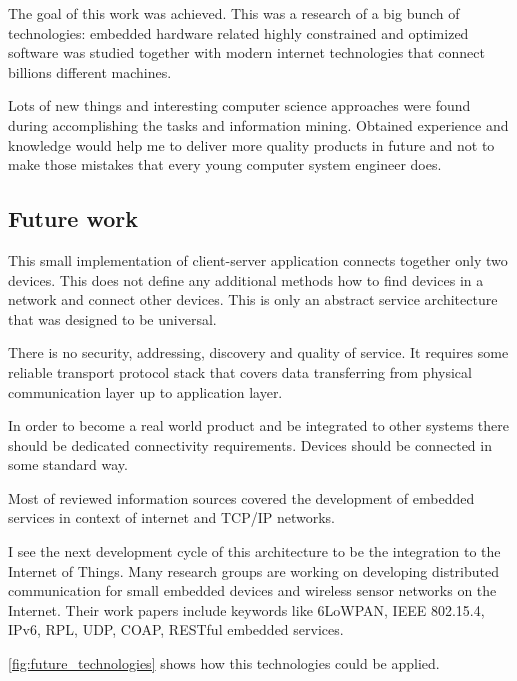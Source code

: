 The goal of this work was achieved.
This was a research of a big bunch of technologies: embedded hardware related
highly constrained and optimized software was studied together with  modern
internet technologies that connect billions different machines.

Lots of new things and interesting computer science approaches were found during 
accomplishing the tasks and information mining.
Obtained experience and knowledge would help me to
deliver more quality products in future and not to make those mistakes that
every young computer system engineer does.

\subsection{Future work}
This small implementation of client-server application connects together only
two devices. 
This does not define any additional methods how to find
devices in a network and connect other devices.
This is only an abstract service architecture that was designed to be universal.

There is no security, addressing, discovery and quality of service. 
It requires some reliable transport protocol stack that covers data transferring
from physical communication layer up to application layer.

In order to become a real world product and be integrated to other systems 
there should be dedicated connectivity requirements.
Devices should be connected in some standard way. 

Most of reviewed information sources covered the development of embedded services in
context of internet and TCP/IP networks.

I see the next development cycle of this architecture to be the integration to
the Internet of Things.
Many research groups are working on developing distributed communication for
small embedded devices and wireless sensor networks on the Internet. 
Their work papers include keywords like 6LoWPAN, IEEE 802.15.4, IPv6, RPL,  UDP, COAP, RESTful embedded services.

\autoref{fig:future_technologies} shows how this technologies could be applied.

